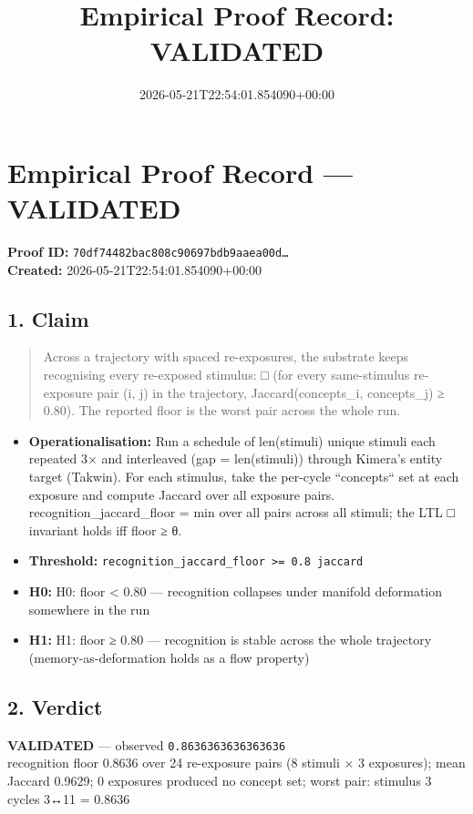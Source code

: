 \documentclass{article}
\title{Empirical Proof Record: VALIDATED}
\date{2026-05-21T22:54:01.854090+00:00}
\begin{document}
\maketitle
\section*{Empirical Proof Record --- \textcolor{validated}{\textbf{VALIDATED}}}
\textbf{Proof ID:} \texttt{70df74482bac808c90697bdb9aaea00d\dots}\\
\textbf{Created:} 2026-05-21T22:54:01.854090+00:00
\subsection*{1. Claim}
\begin{quote}Across a trajectory with spaced re-exposures, the substrate keeps recognising every re-exposed stimulus: □ (for every same-stimulus re-exposure pair (i, j) in the trajectory, Jaccard(concepts\_i, concepts\_j) ≥ 0.80). The reported floor is the worst pair across the whole run.\end{quote}
\begin{itemize}
\item \textbf{Operationalisation:} Run a schedule of len(stimuli) unique stimuli each repeated 3× and interleaved (gap = len(stimuli)) through Kimera's entity target (Takwin). For each stimulus, take the per-cycle ``concepts`` set at each exposure and compute Jaccard over all exposure pairs. recognition\_jaccard\_floor = min over all pairs across all stimuli; the LTL □ invariant holds iff floor ≥ θ.
\item \textbf{Threshold:} \texttt{recognition\_jaccard\_floor >= 0.8 jaccard}
\item \textbf{H0:} H0: floor < 0.80 — recognition collapses under manifold deformation somewhere in the run
\item \textbf{H1:} H1: floor ≥ 0.80 — recognition is stable across the whole trajectory (memory-as-deformation holds as a flow property)
\end{itemize}
\subsection*{2. Verdict}
\textcolor{validated}{\textbf{VALIDATED}} --- observed \texttt{0.8636363636363636}\\
recognition floor 0.8636 over 24 re-exposure pairs (8 stimuli × 3 exposures); mean Jaccard 0.9629; 0 exposures produced no concept set; worst pair: stimulus 3 cycles 3↔11 = 0.8636
\end{document}

